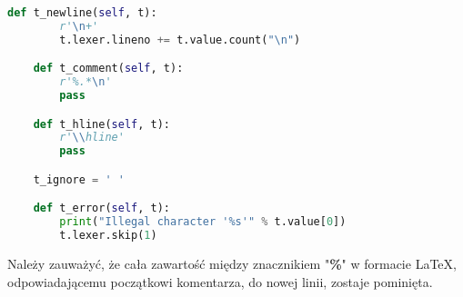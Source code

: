 \begin{lstlisting}[language={Python}, caption={Analiza leksykalna - pozostałe tokeny}, label={analiza-leksykalna-pozostale}]
    def t_newline(self, t):
        r'\n+'
        t.lexer.lineno += t.value.count("\n")

    def t_comment(self, t):
        r'%.*\n'
        pass

    def t_hline(self, t):
        r'\\hline'
        pass

    t_ignore = ' '

    def t_error(self, t):
        print("Illegal character '%s'" % t.value[0])
        t.lexer.skip(1)
\end{lstlisting}

Należy zauważyć, że cała zawartość między znacznikiem "\textbf{\%}" w formacie \LaTeX, odpowiadającemu początkowi komentarza, do nowej linii, 
zostaje pominięta.